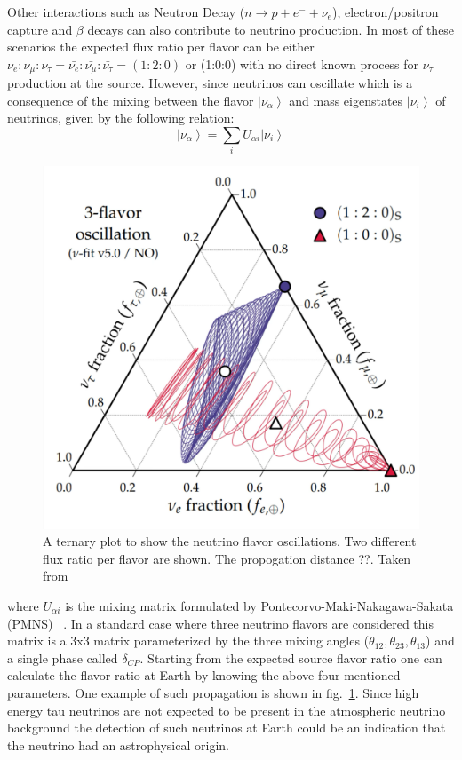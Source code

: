 Other interactions such as Neutron Decay ($n \longrightarrow p + e^- + \nu_{e} $), electron/positron capture and $\beta$ decays can also contribute to neutrino production. In most of these scenarios the expected flux ratio per flavor can be either $ \nu_{e} : \nu_{\mu} : \nu_{\tau} = \bar{\nu_{e}}: \bar{\nu_{\mu}}: \bar{\nu_{\tau}} = (1:2:0) $ or (1:0:0) with no direct known process for $\nu_{\tau}$ production at the source. However, since neutrinos can oscillate which is a consequence of the mixing between the flavor  $\left| \nu_{\alpha} \right\rangle $ and mass eigenstates $\left| \nu_{i} \right\rangle $  of neutrinos, given by the following relation:
\begin{equation}
\left| \nu_{\alpha} \right\rangle  = \sum_i U_{\alpha i} \left| \nu_{i} \right\rangle
\end{equation}
\begin{figure}[t!]
  \centering
  \includegraphics[width=12.5cm]{thesis_figures/CRnNu/Oscillation_sim_ternary.pdf}
  \caption{A ternary plot to show the neutrino flavor oscillations. Two different flux ratio per flavor are shown. The propogation distance ??. Taken from~\cite{Ahlers:ISAPP2022}}
  \label{fig:Oscillation_ternary}
\end{figure}

where $U_{\alpha i}$ is the mixing matrix formulated by Pontecorvo-Maki-Nakagawa-Sakata (PMNS) ~\cite{Pontecorvo:1957qd,10.1143/PTP.28.870}. In a standard case where three neutrino flavors are considered this matrix is a 3x3 matrix parameterized by the three mixing angles ($\theta_{12},\theta_{23},\theta_{13}$) and a single phase called $\delta_{CP}$. Starting from the expected source flavor ratio one can calculate the flavor ratio at Earth by knowing the above four mentioned parameters. One example of such propagation is shown in fig.~\ref{fig:Oscillation_ternary}. Since high energy tau neutrinos are not expected to be present in the atmospheric neutrino background the detection of such neutrinos at Earth could be an indication that the neutrino had an astrophysical origin. 

